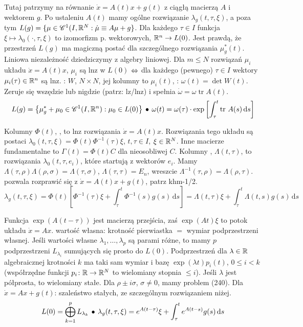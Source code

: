 Tutaj  patrzymy na równanie $\dot x = A(t) x + g(t)$ z ciągłą macierzą $A$ i wektorem $g$.
Po ustaleniu $A(t)$ mamy ogólne rozwiązanie $\lambda_g(t, \tau, \xi)$, a poza tym $L(g) = \{\mu \in \mathscr C^1(I, \mathbb{R}^N : \dot \mu \equiv A \mu + g \}$.
Dla każdego $\tau \in I$ funkcja $\xi \mapsto \lambda_0(\cdot, \tau, \xi)$ to izomorfizm p. wektorowych, $\mathbb{R}^n \to L(0)$.
Jest prawdą, że przestrzeń $L(g)$ ma magiczną postać dla szczególnego rozwiązania $\mu_g^*(t)$.
Liniowa niezależność dziedziczymy z algebry liniowej.
Dla $m \le N$ rozwiązań $\mu_i$ układu $\dot x = A(t) x$, $\mu_i$ są lnz w $L(0)$ $\Leftrightarrow$ dla każdego (pewnego) $\tau \in I$ wektory $\mu_i(\tau) \in \mathbb{R}^n$ są lnz.
: $W$, $N \times N$, jej kolumny to $\mu_i(t)$, : $\omega (t) = \det W(t)$.
Zeruje się wszędzie lub nigdzie (patrz: lz/lnz) i spełnia $\dot \omega = \omega \operatorname{tr} A(t)$.
\[
	L(g) = \left\{ \mu^*_g + \mu_0 \in \mathscr C^1 (I, \mathbb{R}^n) : \mu_0 \in L(0)\right\} \, \bullet \,
	\omega(t) = \omega(\tau) \cdot \exp \left[ \int_\tau^t \textrm{tr } A(s) \,\textrm{d} s\right]
\]

Kolumny  $\Phi(t)$, , to lnz rozwiązania $\dot x = A(t) x$.
Rozwiązania tego układu są postaci $\lambda_0(t, \tau, \xi) = \Phi(t) \Phi^{-1} (\tau) \xi$, $t, \tau \in I$, $\xi \in \mathbb{R}^N$.
Inne macierze fundamentalne to $\Gamma(t) = \Phi(t) C$ dla nieosobliwej $C$.
Kolumny , $\Lambda(t, \tau)$, to rozwiązania $\lambda_0(t, \tau, e_i)$, które startują z wektorów $e_i$.
Mamy $\Lambda(\tau, \rho) \Lambda(\rho, \sigma) = \Lambda(\tau, \sigma)$, $\Lambda(\tau, \tau) = E_n$, wreszcie $\Lambda^{-1}(\tau, \rho) = \Lambda(\rho, \tau)$.
 pozwala rozprawić się z $\dot x = A(t) x + g(t)$, patrz khm-1/2.
\[
	\lambda_g (t, \tau, \xi) = \Phi(t) \left[\Phi^{-1}(\tau) \xi + \int_\tau^t \Phi^{-1}(s) g(s) \,\textrm{d}s \right] = \Lambda(t, \tau) \xi + \int_\tau^t \Lambda (t,s) g(s) \,\textrm{d}s
\]

Funkcja  $\exp(A(t - \tau))$ jest macierzą przejścia, zaś $\exp(At)\xi$ to potok układu $\dot x = Ax$.
 wartość własna: krotność pierwiastka $=$ wymiar podprzestrzeni własnej.
Jeśli wartości własne $\lambda_1, \dots, \lambda_p$ są parami różne, to mamy $p$ podprzestrzeni $L_{\lambda_i}$ sumujących się prosto do $L(0)$.
Podprzestrzeń dla $\lambda \in \mathbb{R}$ algebraicznej krotności $k$ ma taki sam wymiar i bazę $\exp(\lambda t) p_i(t)$, $0 \le i < k$ (współrzędne funkcji $p_i \colon \mathbb{R} \to \mathbb{R}^N$ to wielomiany stopnia $\le i$).
Jeśli $\lambda$ jest półprosta, to wielomiany stałe.
Dla $\rho \pm i \sigma$, $\sigma \neq 0$, mamy problem (240). %
Dla $\dot x = Ax + g(t)$: szaleństwo stałych, ze szczególnym rozwiązaniem niżej.
\[
	L(0) = \bigoplus_{k=1}^p L_{\lambda_k} \, \bullet \,
	\lambda_g(t, \tau, \xi) = e^{A(t-\tau)}\xi + \int_\tau^t e^{A(t-s)} g(s) \,\textrm{d}s
\]

